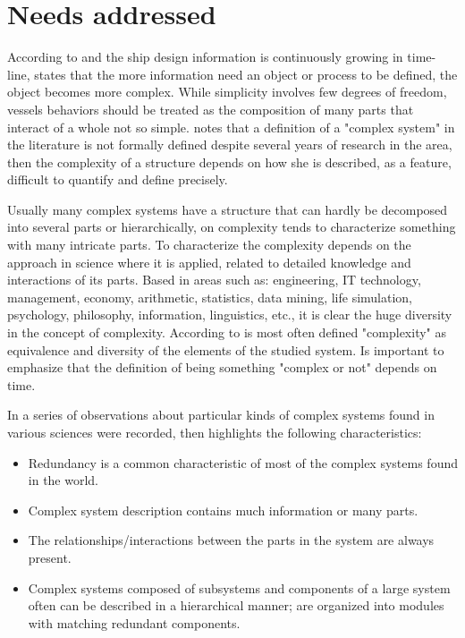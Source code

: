 \section{Needs addressed}


According to \cite{Gaspar12} and \cite{GasparNTNU13} the ship design information is continuously growing in time-line, \cite{Kolmogorov83} states that the more information need an object or process to be defined, the object becomes more complex. While simplicity involves few
degrees of freedom, vessels behaviors should be treated as the composition of many parts that interact of a whole not so simple. \cite{Alexiou10} notes that a definition of a "complex system" in the literature is not formally defined despite several years of research in the area, then the complexity of a structure depends on how she is described, as a feature, difficult to quantify and define precisely.


Usually many complex systems have a structure that can hardly be decomposed into several parts or hierarchically, on  \cite{Simon62} complexity tends to characterize something with many intricate parts. To characterize the complexity depends on the approach in science where it is applied, related to detailed knowledge and interactions of its parts.  Based in areas such as: engineering, IT technology, management, economy, arithmetic, statistics, data mining, life simulation, psychology, philosophy, information, linguistics, etc., it is clear the huge diversity in the concept of complexity. According to \cite{Bonchev05} is most often defined "complexity" as equivalence and diversity of the elements of the studied system. Is important to emphasize that the definition of being something "complex or not" depends on time.


In \cite{Simon96} a series of observations about particular kinds of complex systems  found in various sciences were recorded, then highlights the following characteristics:


\begin{itemize}
\item Redundancy is a common characteristic of most of the complex systems found in the world.
\item Complex system description contains much information or many parts.
\item The relationships/interactions between the parts in the system are always present.
\item Complex systems composed of subsystems and components of a large system often can be described in a hierarchical manner; are organized into modules with matching redundant components.
\end{itemize}


